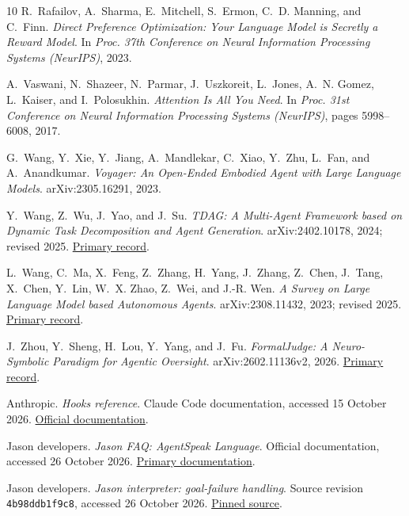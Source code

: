 \documentclass[11pt,a4paper]{article}
\begin{document}
\begin{thebibliography}{10}
R.~Rafailov, A.~Sharma, E.~Mitchell, S.~Ermon, C.~D. Manning, and C.~Finn.
\newblock \emph{Direct Preference Optimization: Your Language Model is Secretly a Reward Model}.
\newblock In \emph{Proc. 37th Conference on Neural Information Processing Systems (NeurIPS)}, 2023.

A.~Vaswani, N.~Shazeer, N.~Parmar, J.~Uszkoreit, L.~Jones, A.~N. Gomez, L.~Kaiser, and I.~Polosukhin.
\newblock \emph{Attention Is All You Need}.
\newblock In \emph{Proc. 31st Conference on Neural Information Processing Systems (NeurIPS)}, pages 5998--6008, 2017.

G.~Wang, Y.~Xie, Y.~Jiang, A.~Mandlekar, C.~Xiao, Y.~Zhu, L.~Fan, and A.~Anandkumar.
\newblock \emph{Voyager: An Open-Ended Embodied Agent with Large Language Models}.
\newblock arXiv:2305.16291, 2023.

Y.~Wang, Z.~Wu, J.~Yao, and J.~Su.
\newblock \emph{TDAG: A Multi-Agent Framework based on Dynamic Task Decomposition and Agent Generation}.
\newblock arXiv:2402.10178, 2024; revised 2025.
\newblock \href{https://arxiv.org/abs/2402.10178v2}{Primary record}.

L.~Wang, C.~Ma, X.~Feng, Z.~Zhang, H.~Yang, J.~Zhang, Z.~Chen, J.~Tang, X.~Chen, Y.~Lin, W.~X. Zhao, Z.~Wei, and J.-R. Wen.
\newblock \emph{A Survey on Large Language Model based Autonomous Agents}.
\newblock arXiv:2308.11432, 2023; revised 2025.
\newblock \href{https://arxiv.org/abs/2308.11432v7}{Primary record}.

J.~Zhou, Y.~Sheng, H.~Lou, Y.~Yang, and J.~Fu.
\newblock \emph{FormalJudge: A Neuro-Symbolic Paradigm for Agentic Oversight}.
\newblock arXiv:2602.11136v2, 2026.
\newblock \href{https://arxiv.org/abs/2602.11136v2}{Primary record}.

Anthropic. \newblock \emph{Hooks reference}. \newblock Claude Code documentation, accessed 15 October 2026. \newblock \href{https://code.claude.com/docs/en/hooks}{Official documentation}.

Jason developers. \newblock \emph{Jason FAQ: AgentSpeak Language}. \newblock Official documentation, accessed 26 October 2026. \newblock \href{https://jason-lang.github.io/doc/faq.html}{Primary documentation}.

Jason developers. \newblock \emph{Jason interpreter: goal-failure handling}. \newblock Source revision \texttt{4b98ddb1f9c8}, accessed 26 October 2026. \newblock \href{https://github.com/jason-lang/jason/blob/4b98ddb1f9c88d3ecdd84c6559f8effbf20f8287/jason-interpreter/src/main/java/jason/asSemantics/TransitionSystem.java}{Pinned source}.

\end{thebibliography}
\end{document}
